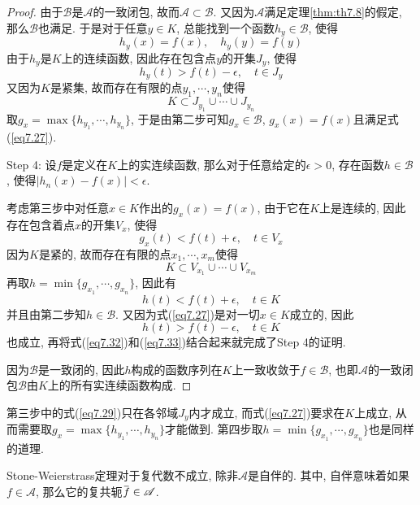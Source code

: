 \documentclass[cn,12pt,math=mtpro2,citestyle=gb7714-2015,bibstyle=gb7714-2015,twocol]{elegantbook}
\newcommand{\overbar}[1]{\mkern 1.5mu\overline{\mkern-1.5mu#1\mkern-1.5mu}\mkern 1.5mu}
\begin{document}
\begin{proof}
      由于$\mathscr{B}$是$\mathscr{A}$的一致闭包, 故而$\mathscr{A}\subset\mathscr{B}$. 又因为$\mathscr{A}$满足定理\ref{thm:th7.8}的假定, 那么$\mathscr{B}$也满足. 于是对于任意$y\in K$, 总能找到一个函数$h_y\in\mathscr{B}$, 使得
      \begin{equation}\label{eq7.28}
        h_y(x)=f(x),\quad h_y(y)=f(y)
      \end{equation}
      由于$h_y$是$K$上的连续函数, 因此存在包含点$y$的开集$J_y$, 使得
      \begin{equation}\label{eq7.29}
        h_y(t)>f(t)-\epsilon, \quad t\in J_y
      \end{equation}
      又因为$K$是紧集, 故而存在有限的点$y_1,\cdots,y_n$使得
      \begin{equation*}\label{eq7.30}
        K\subset J_{y_1}\cup\cdots\cup J_{y_n}
      \end{equation*}
      取$g_x=\max\{h_{y_1},\cdots,h_{y_n}\}$, 于是由第二步可知$g_x\in\mathscr{B}$, $g_x(x)=f(x)$且满足式(\ref{eq7.27}).

      \textcolor[rgb]{0.96,0.53,0.14}{Step 4: 设$f$是定义在$K$上的实连续函数, 那么对于任意给定的$\epsilon>0$, 存在函数$h\in\mathscr{B}$, 使得$|h_n(x)-f(x)|<\epsilon$.}


      考虑第三步中对任意$x\in K$作出的$g_x(x)=f(x)$, 由于它在$K$上是连续的, 因此存在包含着点$x$的开集$V_x$, 使得
      $$g_x(t)<f(t)+\epsilon,\quad t\in V_x$$
      因为$K$是紧的, 故而存在有限的点$x_1,\cdots,x_m$使得
      $$K\subset V_{x_1}\cup\cdots\cup V_{x_m}$$
      再取$h=\min\{g_{x_1},\cdots,g_{x_n}\}$, 因此有
      \begin{equation}\label{eq7.32}
        h(t)<f(t)+\epsilon, \quad t\in K
      \end{equation}
      并且由第二步知$h\in\mathscr{B}$. 又因为式(\ref{eq7.27})是对一切$x\in K$成立的, 因此
      \begin{equation}\label{eq7.33}
        h(t)>f(t)-\epsilon, \quad t\in K
      \end{equation}
      也成立, 再将式(\ref{eq7.32})和(\ref{eq7.33})结合起来就完成了Step 4的证明.

      因为$\mathscr{B}$是一致闭的, 因此$h$构成的函数序列在$K$上一致收敛于$f\in\mathscr{B}$, 也即$\mathscr{A}$的一致闭包$\mathscr{B}$由$K$上的所有实连续函数构成.


\end{proof}
\begin{remark}
第三步中的式(\ref{eq7.29})只在各邻域$J_{y}$内才成立, 而式(\ref{eq7.27})要求在$K$上成立, 从而需要取$g_x=\max\{h_{y_1},\cdots,h_{y_n}\}$才能做到. 第四步取$h=\min\{g_{x_1},\cdots,g_{x_n}\}$也是同样的道理.
\end{remark}
Stone-Weierstrass定理对于复代数不成立, 除非$\mathscr{A}$是自伴的. 其中, 自伴意味着如果$f\in\mathscr{A}$, 那么它的复共轭$\overbar{f}\in\mathscr{A}$.
\end{document}
